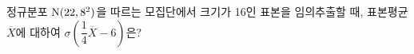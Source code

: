 정규분포 $\mathrm{N}(22{,}\mkern3mu\mathopen{}8^2)$을 따르는 모집단에서 크기가 16인 표본을 임의추출할 때, 표본평균 $\overline{X}$에 대하여 $\sigma\left(\dfrac{1}{4}\overline{X}-6\right)$은?
